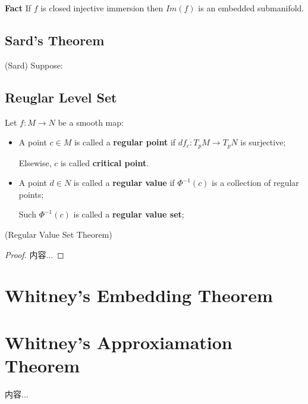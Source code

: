 \documentclass[Total.tex]{subfiles}
\begin{document}
			\textbf{Fact} If $f$ is closed injective immersion then $Im(f)$ is an embedded submanifold.
			
			
			\subsection{Sard's Theorem}
			\begin{theorem}
				(Sard) Suppose:
			\end{theorem}
			
			\subsection{Reuglar Level Set}
			\begin{Def} Let $f:M\rightarrow N$ be a smooth map:
				\begin{itemize}
					\item A point $c\in M$ is called a \textbf{regular point} if $df_c:T_p M\rightarrow T_p N$ is surjective;
					
					Elsewise, $c$ is called \textbf{critical point}.
					\item A point $d\in N$ is called a \textbf{regular value} if $\Phi^{-1}(c)$ is a collection of regular points;
					
					Such $\Phi^{-1}(c)$ is called a \textbf{regular value set};
				\end{itemize}
			\end{Def}
			
			\begin{theorem}
				(Regular Value Set Theorem)
			\end{theorem}
			\begin{proof}
				内容...
			\end{proof}
			
		\section{Whitney's Embedding Theorem}
		\section{Whitney's Approxiamation Theorem}
			\begin{Def}
				内容...
			\end{Def}
\end{document}
